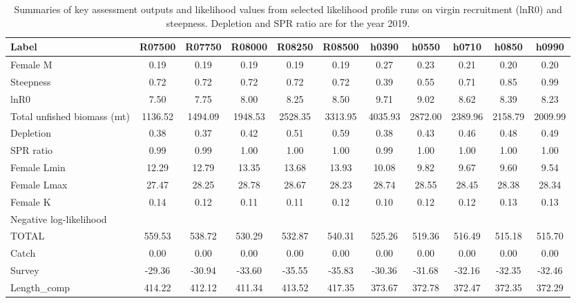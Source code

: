 \documentclass[12pt,]{article}
\begin{document}
\newpage

\begin{landscape}

\begin{table}[ht]
\centering
\caption{Summaries of key assessment outputs 
                                              and likelihood values from selected 
                                              likelihood profile runs on virgin 
                                              recruitment (lnR0) and steepness.  
                                              Depletion and SPR ratio are for the year 2019.} 
\label{tab:like_profiles}
\begin{tabular}{l|ccccc|ccccc}
  \hline
Label & R07500 & R07750 & R08000 & R08250 & R08500 & h0390 & h0550 & h0710 & h0850 & h0990 \\ 
  \hline
Female M & 0.19 & 0.19 & 0.19 & 0.19 & 0.19 & 0.27 & 0.23 & 0.21 & 0.20 & 0.20 \\ 
  Steepness & 0.72 & 0.72 & 0.72 & 0.72 & 0.72 & 0.39 & 0.55 & 0.71 & 0.85 & 0.99 \\ 
  lnR0 & 7.50 & 7.75 & 8.00 & 8.25 & 8.50 & 9.71 & 9.02 & 8.62 & 8.39 & 8.23 \\ 
  Total unfished biomass (mt) & 1136.52 & 1494.09 & 1948.53 & 2528.35 & 3313.95 & 4035.93 & 2872.00 & 2389.96 & 2158.79 & 2009.99 \\ 
  Depletion & 0.38 & 0.37 & 0.42 & 0.51 & 0.59 & 0.38 & 0.43 & 0.46 & 0.48 & 0.49 \\ 
  SPR ratio & 0.99 & 0.99 & 1.00 & 1.00 & 1.00 & 0.99 & 1.00 & 1.00 & 1.00 & 1.00 \\ 
  Female Lmin & 12.29 & 12.79 & 13.35 & 13.68 & 13.93 & 10.08 & 9.82 & 9.67 & 9.60 & 9.54 \\ 
  Female Lmax & 27.47 & 28.25 & 28.78 & 28.67 & 28.23 & 28.74 & 28.55 & 28.45 & 28.38 & 28.34 \\ 
  Female K & 0.14 & 0.12 & 0.11 & 0.11 & 0.12 & 0.10 & 0.12 & 0.12 & 0.13 & 0.13 \\ 
  Negative log-likelihood &  &  &  &  &  &  &  &  &  &  \\ 
  TOTAL & 559.53 & 538.72 & 530.29 & 532.87 & 540.31 & 525.26 & 519.36 & 516.49 & 515.18 & 515.70 \\ 
  Catch & 0.00 & 0.00 & 0.00 & 0.00 & 0.00 & 0.00 & 0.00 & 0.00 & 0.00 & 0.00 \\ 
  Survey & -29.36 & -30.94 & -33.60 & -35.55 & -35.83 & -30.36 & -31.68 & -32.16 & -32.35 & -32.46 \\ 
  Length\_comp & 414.22 & 412.12 & 411.34 & 413.52 & 417.35 & 373.67 & 372.78 & 372.47 & 372.35 & 372.29 \\ 

\end{tabular}
\end{table}
\end{landscape}
\end{document}
